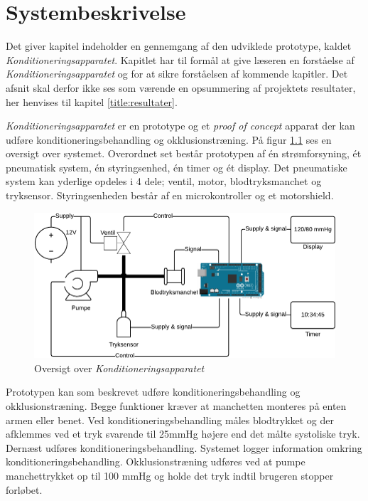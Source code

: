 \chapter{Systembeskrivelse}
Det giver kapitel indeholder en gennemgang af den udviklede prototype, kaldet \textit{Konditioneringsapparatet}. Kapitlet har til formål at give læseren en forståelse af \textit{Konditioneringsapparatet} og for at sikre forståelsen af kommende kapitler. Det afsnit skal derfor ikke ses som værende en opsummering af projektets resultater, her henvises til kapitel \ref{title:resultater}.

\textit{Konditioneringsapparatet} er en prototype og et \textit{proof of concept} apparat der kan udføre konditioneringsbehandling og okklusionstræning. På figur \ref{fig:systemTegning} ses en oversigt over systemet. Overordnet set består prototypen af én strømforsyning, ét pneumatisk system, én styringsenhed, én timer og ét display. Det pneumatiske system kan yderlige opdeles i 4 dele; ventil, motor, blodtryksmanchet og tryksensor. Styringsenheden består af en microkontroller og et motorshield. 

\begin{figure}[H]
	\centering
	\includegraphics[width = \textwidth]{billeder/systemDrawing-crop.pdf}
	\caption{Oversigt over \textit{Konditioneringsapparatet}} \label{fig:systemTegning}
\end{figure}

Prototypen kan som beskrevet udføre konditioneringsbehandling og okklusionstræning. Begge funktioner kræver at manchetten monteres på enten armen eller benet. Ved konditioneringsbehandling måles blodtrykket og der afklemmes ved et tryk svarende til 25mmHg højere end det målte systoliske tryk. Dernæst udføres konditioneringsbehandling. Systemet logger information omkring konditioneringsbehandling. Okklusionstræning udføres ved at pumpe manchettrykket op til 100 mmHg og holde det tryk indtil brugeren stopper forløbet. 

